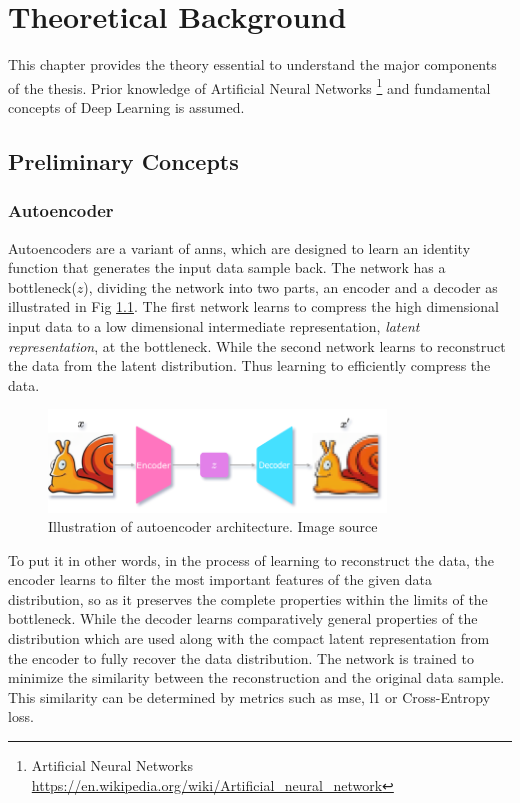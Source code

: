 \chapter{Theoretical Background}
\label{chap:background}

This chapter provides the theory essential to understand the major components of the thesis. Prior knowledge of Artificial Neural Networks \footnote{Artificial Neural Networks \url{https://en.wikipedia.org/wiki/Artificial_neural_network}} and fundamental concepts of Deep Learning \cite{theory_dl} is assumed.

\section{Preliminary Concepts}
\label{sec:Preliminary}

\subsection{Autoencoder}
Autoencoders are a variant of \acp{ann}, which are designed to learn an identity function that generates the input data sample back. The network has a bottleneck($z$), dividing the network into two parts, an encoder and a decoder as illustrated in Fig \ref{fig:ae_arch}. The first network learns to compress the high dimensional input data to a low dimensional intermediate representation, \textit{latent representation}, at the bottleneck. While the second network learns to reconstruct the data from the latent distribution. Thus learning to efficiently compress the data.

\begin{figure}[h]
    \centering
    \includegraphics[width=0.8\textwidth]{figures/arch/ae_arch.png}
    \caption{Illustration of autoencoder architecture. Image source \cite{deepimageprior}}
    \label{fig:ae_arch}
\end{figure}

To put it in other words, in the process of learning to reconstruct the data, the encoder learns to filter the most important features of the given data distribution, so as it preserves the complete properties within the limits of the bottleneck. While the decoder learns comparatively general properties of the distribution which are used along with the compact latent representation from the encoder to fully recover the data distribution. The network is trained to minimize the similarity between the reconstruction and the original data sample. This similarity can be determined by metrics such as \ac{mse}, \ac{l1} or Cross-Entropy loss.


